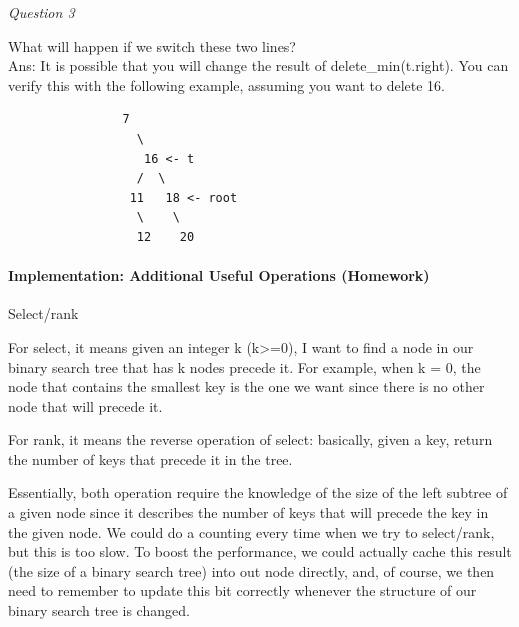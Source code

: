 \documentclass[11pt]{article}
\begin{document}
\emph{Question 3}

What will happen if we switch these two lines?\\
Ans: It is possible that you will change the result of
delete\_min(t.right). You can verify this with the following example,
assuming you want to delete 16.

\begin{verbatim}
                7 
                  \
                   16 <- t
                  /  \
                 11   18 <- root
                  \    \
                  12    20
\end{verbatim}

    \paragraph{Implementation: Additional Useful Operations
(Homework)}\label{implementation-additional-useful-operations-homework}

Select/rank

For select, it means given an integer k (k\textgreater{}=0), I want to
find a node in our binary search tree that has k nodes precede it. For
example, when k = 0, the node that contains the smallest key is the one
we want since there is no other node that will precede it.

For rank, it means the reverse operation of select: basically, given a
key, return the number of keys that precede it in the tree.

Essentially, both operation require the knowledge of the size of the
left subtree of a given node since it describes the number of keys that
will precede the key in the given node. We could do a counting every
time when we try to select/rank, but this is too slow. To boost the
performance, we could actually cache this result (the size of a binary
search tree) into out node directly, and, of course, we then need to
remember to update this bit correctly whenever the structure of our
binary search tree is changed.
\end{document}
